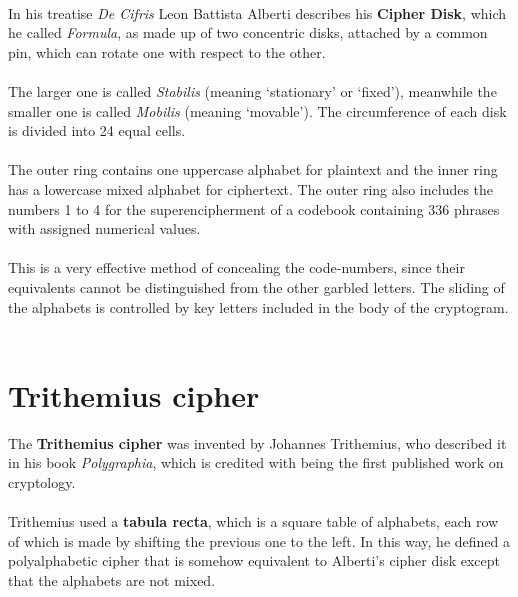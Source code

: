 \documentclass[Lau,binding=0.6cm,oneside]{sapthesis}
\begin{document}
\ \\

In his treatise \textit{De Cifris} Leon Battista Alberti describes his \textbf{Cipher Disk}, which he called \textit{Formula}, as made up of two concentric disks, attached by a common pin, which can rotate one with respect to the other.\\\\
The larger one is called \textit{Stabilis} (meaning `stationary' or `fixed'), meanwhile the smaller one is called \textit{Mobilis} (meaning `movable'). The circumference of each disk is divided into 24 equal cells.\\\\
The outer ring contains one uppercase alphabet for plaintext and the inner ring has a lowercase mixed alphabet for ciphertext. The outer ring also includes the numbers 1 to 4 for the superencipherment of a codebook containing 336 phrases with assigned numerical values.\\\\
This is a very effective method of concealing the code-numbers, since their equivalents cannot be distinguished from the other garbled letters. The sliding of the alphabets is controlled by key letters included in the body of the cryptogram\supercite{alberti}.\\\\

\section{Trithemius cipher}
The \textbf{Trithemius cipher} was invented by Johannes Trithemius, who described it in his book \textit{Polygraphia}, which is credited with being the first published work on cryptology\supercite{trithemius}.\\\\
Trithemius used a \textbf{tabula recta}, which is a square table of alphabets, each row of which is made by shifting the previous one to the left. In this way, he defined a polyalphabetic cipher that is somehow equivalent to Alberti's cipher disk except that the alphabets are not mixed.\\\\
\end{document}
